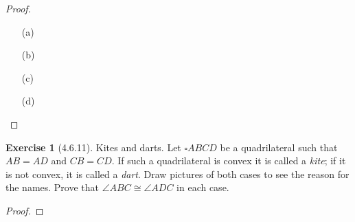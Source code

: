 \documentclass[12pt]{article}		%
\theoremstyle{definition}
\newtheorem*{ex}{Exercise}
\begin{document}
\begin{proof} 
	$\,$
	
	\begin{itemize}
		\item[(a)]     
		
		\item[(b)]
		
		\item[(c)]
		
		\item[(d)]
	\end{itemize}
	
\end{proof}



\vspace{1in} %




\begin{ex}[4.6.11]
	Kites and darts.  Let $\square ABCD$ be a quadrilateral such that $AB = AD$ and $CB = CD$.  If such a quadrilateral is convex it is called a \textit{kite}; if it is not convex, it is called a  \textit{dart}.  Draw pictures of both cases to see the reason for the names.  Prove that $\angle ABC \cong \angle ADC$ in each case.
\end{ex}

\begin{proof} 
	
	
\end{proof}



\vspace{1in} %





	
	
	
\end{document}

